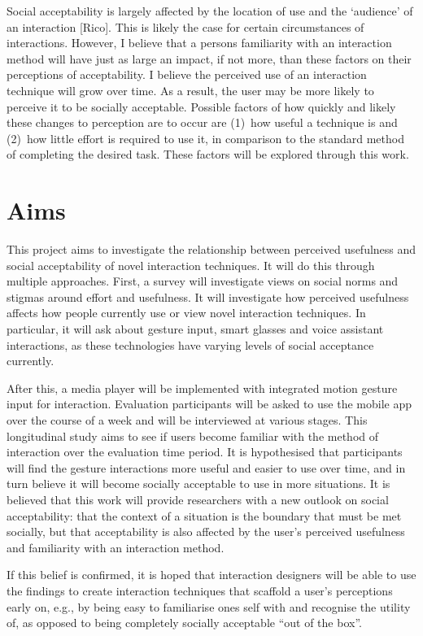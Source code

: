 \documentclass{l4proj}
\begin{document}
Social acceptability is largely affected by the location of use and the `audience' of an interaction [Rico]. This is likely the case for certain circumstances of interactions. However, I believe that a persons familiarity with an interaction method will have just as large an impact, if not more, than these factors on their perceptions of acceptability. I believe the perceived use of an interaction technique will grow over time. As a result, the user may be more likely to perceive it to be socially acceptable. Possible factors of how quickly and likely these changes to perception are to occur are (1)~how useful a technique is and (2)~how little effort is required to use it, in comparison to the standard method of completing the desired task. These factors will be explored through this work.

\section{Aims}

This project aims to investigate the relationship between perceived usefulness and social acceptability of novel interaction techniques. It will do this through multiple approaches. First, a survey will investigate views on social norms and stigmas around effort and usefulness. It will investigate how perceived usefulness affects how people currently use or view novel interaction techniques. In particular, it will ask about gesture input, smart glasses and voice assistant interactions, as these technologies have varying levels of social acceptance currently.

After this, a media player will be implemented with integrated motion gesture input for interaction. Evaluation participants will be asked to use the mobile app over the course of a week and will be interviewed at various stages. This longitudinal study aims to see if users become familiar with the method of interaction over the evaluation time period. It is hypothesised that participants will find the gesture interactions more useful and easier to use over time, and in turn believe it will become socially acceptable to use in more situations. It is believed that this work will provide researchers with a new outlook on social acceptability: that the context of a situation is the boundary that must be met socially, but that acceptability is also affected by the user's perceived usefulness and familiarity with an interaction method.

If this belief is confirmed, it is hoped that interaction designers will be able to use the findings to create interaction techniques that scaffold a user's perceptions early on, e.g., by being easy to familiarise ones self with and recognise the utility of, as opposed to being completely socially acceptable ``out of the box''. 
\end{document}
